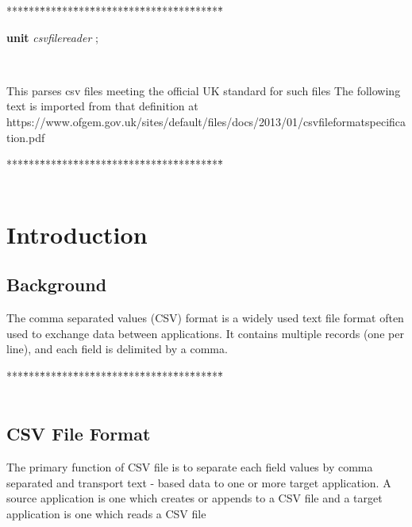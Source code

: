 \begin{tabbing}
***\=***\=***\=***\=***\=***\=***\=***\=***\=***\=***\=***\=***\=\kill
\parbox{14cm}{\textsf{\textbf{unit}  \textit{csvfilereader} ;}}\\
\end{tabbing}
This parses csv files meeting the official UK standard for such files The following text is imported from that
definition at https://www.ofgem.gov.uk/sites/default/files/docs/2013/01/csvfileformatspecification.pdf
\begin{tabbing}
***\=***\=***\=***\=***\=***\=***\=***\=***\=***\=***\=***\=***\=\kill
\\
\\
\end{tabbing}
\section{Introduction}
\subsection{Background}
The  comma
separated  values  (CSV)  format  is  a  widely  used  text  file  format  often  used  to  exchange
data  between  applications.  It  contains  multiple  records  (one  per  line),  and  each  field  is  delimited  by  a
comma.
\begin{tabbing}
***\=***\=***\=***\=***\=***\=***\=***\=***\=***\=***\=***\=***\=\kill
\\
\\
\end{tabbing}
\subsection{CSV File Format}
The primary function
of CSV file
is to
separate each field values by comma separated and
transport
text
-
based data
to one or more target application. A source application is one which creates or appends
to a CSV file
and a
target application is one which reads a CSV file
